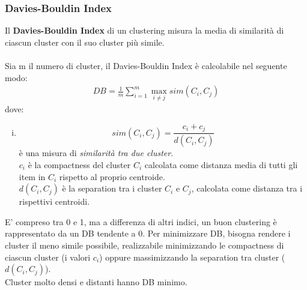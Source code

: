 \subsubsection{Davies-Bouldin Index}
Il \textbf{Davies-Bouldin Index} di un clustering misura la media di similarità di ciascun cluster con il suo cluster più simile.\\
\\
Sia m il numero di cluster, il Davies-Bouldin Index è calcolabile nel seguente modo:
\begin{align}
	DB = \frac{1}{m}\sum_{i=1}^{m}\max_{i \ne j}sim(C_i, C_j)
\end{align}
dove:
\begin{enumerate}[(i)]
	\item $$ sim(C_i, C_j) =  \frac{c_i + c_j}{d(C_i, C_j)}$$ è una misura di \textit{similarità tra due cluster}.\\
	$c_i$ è la compactness del cluster $C_i$ calcolata come distanza media di tutti gli item in $C_i$ rispetto al proprio centroide.\\
	$d(C_i, C_j)$ è la separation tra i cluster $C_i$ e $C_j$, calcolata come distanza tra i rispettivi centroidi.
\end{enumerate}
E' compreso tra 0 e 1, ma a differenza di altri indici, un buon clustering è rappresentato da un DB tendente a 0. Per minimizzare DB, bisogna rendere i cluster il meno simile possibile, realizzabile minimizzando le compactness di ciascun cluster (i valori $c_i$) oppure massimizzando la separation tra cluster ($d(C_i, C_j)$).\\
Cluster molto densi e distanti hanno DB minimo.

